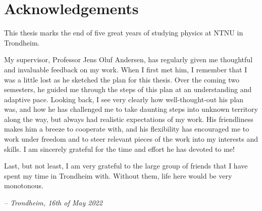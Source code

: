 \mbox{}\vfill
\begin{center}
\end{center}

\chapter*{Acknowledgements}

This thesis marks the end of five great years of studying physics at NTNU in Trondheim.

My supervisor, Professor Jens Oluf Andersen,
has regularly given me thoughtful and invaluable feedback on my work.
When I first met him,
I remember that I was a little lost as he sketched the plan for this thesis.
Over the coming two semesters, he guided me through the steps of this plan at an understanding and adaptive pace.
Looking back, I see very clearly how well-thought-out his plan was,
and how he has challenged me to take daunting steps into unknown territory along the way,
but always had realistic expectations of my work.
His friendliness makes him a breeze to cooperate with,
and his flexibility has encouraged me to work under freedom and to steer relevant pieces of the work into my interests and skills.
I am sincerely grateful for the time and effort he has devoted to me!

Last, but not least, I am very grateful to the large group of friends that I have spent my time in Trondheim with.
Without them, life here would be very monotonous.

\null\hfill \textit{-- Trondheim, 16th of May 2022}
